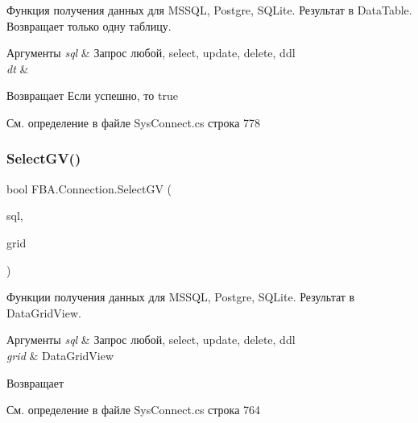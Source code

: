 Функция получения данных для M\+S\+S\+QL, Postgre, S\+Q\+Lite. Результат в Data\+Table. Возвращает только одну таблицу. ~\newline



\begin{DoxyParams}{Аргументы}
{\em sql} & Запрос любой, select, update, delete, ddl\\
\hline
{\em dt} & \\
\hline
\end{DoxyParams}
\begin{DoxyReturn}{Возвращает}
Если успешно, то true
\end{DoxyReturn}


См. определение в файле Sys\+Connect.\+cs строка 778

\mbox{\label{class_f_b_a_1_1_connection_ab741e12a89628ff1afe3aa50e019d836}} 
\subsubsection{\texorpdfstring{Select\+G\+V()}{SelectGV()}}
{\footnotesize\ttfamily bool F\+B\+A.\+Connection.\+Select\+GV (\begin{DoxyParamCaption}\item[{string}]{sql,  }\item[{Data\+Grid\+View}]{grid }\end{DoxyParamCaption})}



Функции получения данных для M\+S\+S\+QL, Postgre, S\+Q\+Lite. Результат в Data\+Grid\+View. ~\newline



\begin{DoxyParams}{Аргументы}
{\em sql} & Запрос любой, select, update, delete, ddl\\
\hline
{\em grid} & Data\+Grid\+View\\
\hline
\end{DoxyParams}
\begin{DoxyReturn}{Возвращает}

\end{DoxyReturn}


См. определение в файле Sys\+Connect.\+cs строка 764



